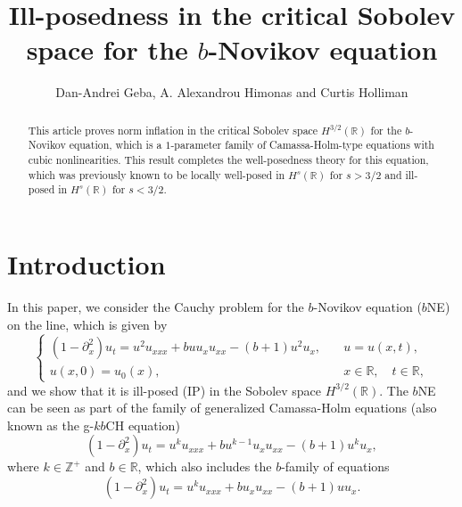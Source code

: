 \documentclass{amsart}
\newcommand{\R}{\mathbb R}
\newcommand{\p}{\partial}
\begin{document}

\title[Ill-posedness for the $b$-Novikov equation]{Ill-posedness in the critical Sobolev space for the $b$-Novikov equation}

\author{Dan-Andrei Geba, A. Alexandrou Himonas and Curtis Holliman}


\address{Department of Mathematics, University of Rochester, Rochester, NY 14627, U.S.A.}
\address{Department of Mathematics, University of Notre Dame, Notre Dame, IN 46556, U.S.A.}
\address{Department of Mathematics, The Catholic University of America, Washington, DC 20064, U.S.A.}
\date{}

\begin{abstract}
This article proves norm inflation in the critical Sobolev space  $H^{3/2}(\R)$ for  the $b$-Novikov equation, which is a $1$-parameter family of Camassa-Holm-type equations with cubic nonlinearities. This result completes the well-posedness theory for this equation, which was previously known to be locally well-posed in $H^{s}(\R)$ for $s>3/2$ and ill-posed in  $H^{s}(\R)$ for $s<3/2$.
\end{abstract}


\maketitle


\section{Introduction}

In this paper, we consider the Cauchy problem for the $b$-Novikov equation ($b$NE) on the line, which is given by
\begin{equation}
\begin{cases}
(1-\p^2_x)u_t= u^2u_{xxx}+bu u_x u_{xx}- (b+1)u^2u_x, &\quad u=u(x,t),\\
u(x,0)=u_0(x), &\quad x\in \R, \quad t\in \R,
\end{cases}
\label{cp}
\end{equation}
and we show that it is ill-posed (IP) in the Sobolev space $H^{3/2}(\R)$. The $b$NE can be seen as part of the family of generalized Camassa-Holm equations (also known as the g-$kb$CH equation)
\begin{equation}
(1-\p^2_x)u_t= u^ku_{xxx}+bu^{k-1} u_x u_{xx}- (b+1)u^ku_x,\label{gkb}
\end{equation}
where $k\in \mathbb{Z}^+$ and $b\in \R$, which also includes the $b$-family of equations
\begin{equation}
(1-\p^2_x)u_t= u^ku_{xxx}+b u_x u_{xx}- (b+1)u u_x \label{b}.
\end{equation}
\end{document}
